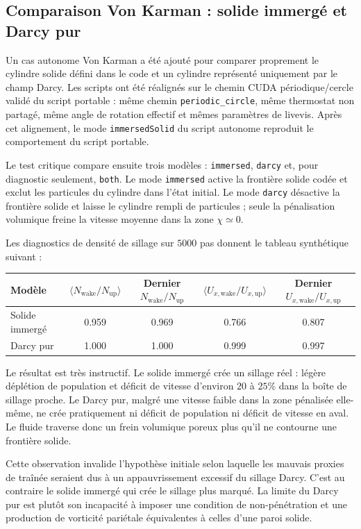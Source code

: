 \documentclass[11pt,a4paper]{article}
\begin{document}
\subsection{Comparaison Von Karman : solide immergé et Darcy pur}

Un cas autonome Von Karman a été ajouté pour comparer proprement le cylindre solide défini dans le code et un cylindre représenté uniquement par le champ Darcy. Les scripts ont été réalignés sur le chemin CUDA périodique/cercle validé du script portable : même chemin \texttt{periodic\_circle}, même thermostat non partagé, même angle de rotation effectif et mêmes paramètres de livevis. Après cet alignement, le mode \texttt{immersedSolid} du script autonome reproduit le comportement du script portable.

Le test critique compare ensuite trois modèles : \texttt{immersed}, \texttt{darcy} et, pour diagnostic seulement, \texttt{both}. Le mode \texttt{immersed} active la frontière solide codée et exclut les particules du cylindre dans l'état initial. Le mode \texttt{darcy} désactive la frontière solide et laisse le cylindre rempli de particules ; seule la pénalisation volumique freine la vitesse moyenne dans la zone $\chi\simeq0$.

Les diagnostics de densité de sillage sur $5000$ pas donnent le tableau synthétique suivant :
\begin{center}
\begin{tabular}{lcccc}
\toprule
Modèle & $\langle N_{\mathrm{wake}}/N_{\mathrm{up}}\rangle$ & Dernier $N_{\mathrm{wake}}/N_{\mathrm{up}}$ & $\langle U_{x,\mathrm{wake}}/U_{x,\mathrm{up}}\rangle$ & Dernier $U_{x,\mathrm{wake}}/U_{x,\mathrm{up}}$\\
\midrule
Solide immergé & 0.959 & 0.969 & 0.766 & 0.807\\
Darcy pur & 1.000 & 1.000 & 0.999 & 0.997\\
\bottomrule
\end{tabular}
\end{center}
Le résultat est très instructif. Le solide immergé crée un sillage réel : légère déplétion de population et déficit de vitesse d'environ $20$ à $25\%$ dans la boîte de sillage proche. Le Darcy pur, malgré une vitesse faible dans la zone pénalisée elle-même, ne crée pratiquement ni déficit de population ni déficit de vitesse en aval. Le fluide traverse donc un frein volumique poreux plus qu'il ne contourne une frontière solide.

Cette observation invalide l'hypothèse initiale selon laquelle les mauvais proxies de traînée seraient dus à un appauvrissement excessif du sillage Darcy. C'est au contraire le solide immergé qui crée le sillage plus marqué. La limite du Darcy pur est plutôt son incapacité à imposer une condition de non-pénétration et une production de vorticité pariétale équivalentes à celles d'une paroi solide.
\end{document}
